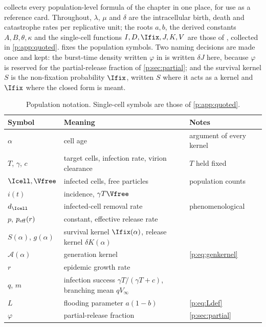  collects every population-level formula of the
chapter in one place, for use as a reference card.
Throughout, $\lambda$, $\mu$ and $\delta$ are the intracellular birth, death
and catastrophe rates per replicative unit; the roots $a,b$, the derived
constants $A,B,\theta,\kappa$ and the single-cell functions
$I,D,\Ifix,J,K,V$ are those of \ChCore{}, collected in
\cref{p:app:quoted}.  fixes the population symbols. Two
naming decisions are made once and kept: the burst-time density written
$\varphi$ in \ChDist{} is written $\delta J$ here, because $\varphi$ is
reserved for the partial-release fraction of \cref{p:sec:partial}; and the
survival kernel $S$ is the non-fixation probability $\Ifix$, written $S$
where it acts as a kernel and $\Ifix$ where the closed form is meant.

\begin{table}[htbp]
\centering
\renewcommand{\arraystretch}{1.12}
\small
\begin{tabular}{@{}lp{}p{}@{}}
\toprule
Symbol & Meaning & Notes \\
\midrule
$\alpha$ & cell age & argument of every kernel \\
$T$, $\gamma$, $c$ & target cells, infection rate, virion clearance & $T$ held fixed \\
$\Icell,\Vfree$ & infected cells, free particles & population counts \\
$i(t)$ & incidence, $\gamma T\Vfree$ & \\
$d_{\Icell}$ & infected-cell removal rate & phenomenological \\
$p$, $p_{\rm eff}(r)$ & constant, effective release rate & \\
$S(\alpha)$, $g(\alpha)$ & survival kernel $\Ifix(\alpha)$, release kernel $\delta K(\alpha)$ & \\
$\mathcal A(\alpha)$ & generation kernel & \cref{p:eq:genkernel} \\
$r$ & epidemic growth rate & \\
$q$, $m$ & infection success $\gamma T/(\gamma T+c)$, branching mean $qV_\infty$ & \\
$L$ & flooding parameter $a(1-b)$ & \cref{p:eq:Ldef} \\
$\varphi$ & partial-release fraction & \cref{p:sec:partial} \\
\bottomrule
\end{tabular}
\caption{Population notation. Single-cell symbols are those of
\cref{p:app:quoted}.}
\label{p:tab:notation}
\end{table}

